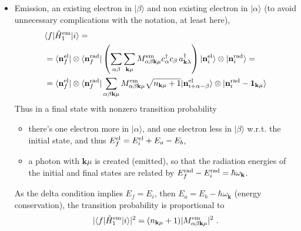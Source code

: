 \documentclass[letterpaper,10pt,english]{jupyterBook}
\begin{document}
\begin{itemize}
\sphinxAtStartPar
As the delta condition implies \(E_f = E_i\), then \(E_a - E_b = \hbar \omega_{\mathbf{k}}\) (energy conservation), the transition probability is proportional to
\begin{equation*}
\begin{split}|\langle f | \hat{H}^{\rm abs}_{\rm 1} | i \rangle|^2 = n_{\mathbf{k} \mu} | M^{\rm abs}_{\alpha \beta \mathbf{k} \mu} |^2 \ .\end{split}
\end{equation*}
\item {} 
\sphinxAtStartPar
Emission,  an existing electron in \(| \beta \rangle\) and non existing electron in \(| \alpha \rangle\) (to avoid unnecessary complications with the notation, at least here),
\begin{equation*}
\begin{split}\begin{aligned}
     & \langle f | \hat{H}^{\rm em}_{\rm 1} | i \rangle = \\
     & = \langle \mathbf{n}^{\rm el}_f | \otimes \langle \mathbf{n}_f^{\rm rad} | \left( \sum_{\alpha\beta}\sum_{\mathbf k \mu} M_{\alpha \beta \mathbf{k} \mu}^{\rm em} c_\alpha^\dagger c_\beta\,a^\dagger_{\mathbf k\lambda}  \right)  | \mathbf{n}^{\rm el}_i \rangle \otimes | \mathbf{n}_i^{\rm rad} \rangle = \\
     & = \langle \mathbf{n}^{\rm el}_f | \otimes \langle \mathbf{n}_f^{\rm rad} | \sum_{\alpha\beta \mathbf{k} \mu} M_{\alpha \beta \mathbf{k} \mu}^{\rm em} \sqrt{n_{\mathbf{k}\mu} + 1} | \mathbf{n}^{\rm el}_{i+\alpha-\beta} \rangle \otimes | \mathbf{n}^{\rm rad}_i - \mathbf{1}_{\mathbf{k}\mu} \rangle 
   \end{aligned}\end{split}
\end{equation*}
\sphinxAtStartPar
Thus in a final state with non\sphinxhyphen{}zero transition probability
\begin{itemize}
\item {} 
\sphinxAtStartPar
there’s one electron more in \(| \alpha \rangle\), and one electron less in \(| \beta \rangle\) w.r.t. the initial state, and thus \(E^{\rm el}_f = E^{\rm el}_i + E_a - E_b\),

\item {} 
\sphinxAtStartPar
a photon with \(\mathbf{k} \mu\) is created (emitted), so that the radiation energies of the initial and final states are related by \(E_f^{\rm rad} - E_i^{\rm rad} = \hbar \omega_{\mathbf{k}}\).

\end{itemize}

\sphinxAtStartPar
As the delta condition implies \(E_f = E_i\), then \(E_a = E_b - \hbar \omega_{\mathbf{k}}\) (energy conservation), the transition probability is proportional to
\begin{equation*}
\begin{split}|\langle f | \hat{H}^{\rm em}_{\rm 1} | i \rangle|^2 = ( n_{\mathbf{k} \mu} + 1) | M^{\rm em}_{\alpha \beta \mathbf{k} \mu} |^2 \ .\end{split}
\end{equation*}
\end{itemize}
\end{document}
